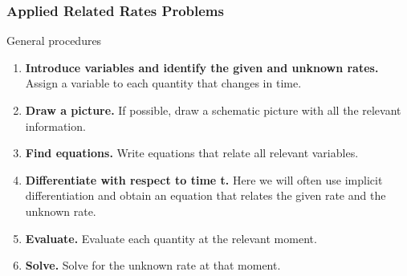 \documentclass[10pt,t,handout,ignorenonframetext,aspectratio=169]{beamer}
\title[\course]{\lecTitle}
\institute[Ohio State]
{
  \medskip
}
\date[\week]{\semester}
\author{Tae Eun Kim, Ph.D.}
\begin{document}
\begin{frame}
  \titlepage
\end{frame}

\begin{frame}[t]
  \frametitle{Applied Related Rates Problems}
  \begin{block}{General procedures}
    \begin{enumerate}
    \item \textbf{Introduce variables and identify the given and unknown
        rates.} Assign a variable to each quantity that changes in time.
    \item \textbf{Draw a picture.} If possible, draw a schematic picture
      with all the relevant information.
    \item \textbf{Find equations.} Write equations that relate all
      relevant variables.
    \item \textbf{Differentiate with respect to time t.} Here we will
      often use implicit differentiation and obtain an equation that
      relates the given rate and the unknown rate.
    \item \textbf{Evaluate.} Evaluate each quantity at the relevant
      moment.
    \item \textbf{Solve.} Solve for the unknown rate at that moment.
    \end{enumerate}
  \end{block}
\end{frame}
\end{document}
